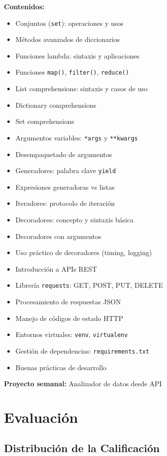\documentclass[12pt,letterpaper]{article}
\begin{document}
\textbf{Contenidos:}
\begin{itemize}[leftmargin=*]
    \item Conjuntos (\texttt{set}): operaciones y usos
    \item Métodos avanzados de diccionarios
    \item Funciones lambda: sintaxis y aplicaciones
    \item Funciones \texttt{map()}, \texttt{filter()}, \texttt{reduce()}
    \item List comprehensions: sintaxis y casos de uso
    \item Dictionary comprehensions
    \item Set comprehensions
    \item Argumentos variables: \texttt{*args} y \texttt{**kwargs}
    \item Desempaquetado de argumentos
    \item Generadores: palabra clave \texttt{yield}
    \item Expresiones generadoras vs listas
    \item Iteradores: protocolo de iteración
    \item Decoradores: concepto y sintaxis básica
    \item Decoradores con argumentos
    \item Uso práctico de decoradores (timing, logging)
    \item Introducción a APIs REST
    \item Librería \texttt{requests}: GET, POST, PUT, DELETE
    \item Procesamiento de respuestas JSON
    \item Manejo de códigos de estado HTTP
    \item Entornos virtuales: \texttt{venv}, \texttt{virtualenv}
    \item Gestión de dependencias: \texttt{requirements.txt}
    \item Buenas prácticas de desarrollo
\end{itemize}

\textbf{Proyecto semanal:} Analizador de datos desde API

\newpage

\section{Evaluación}

\subsection{Distribución de la Calificación}
\end{document}
